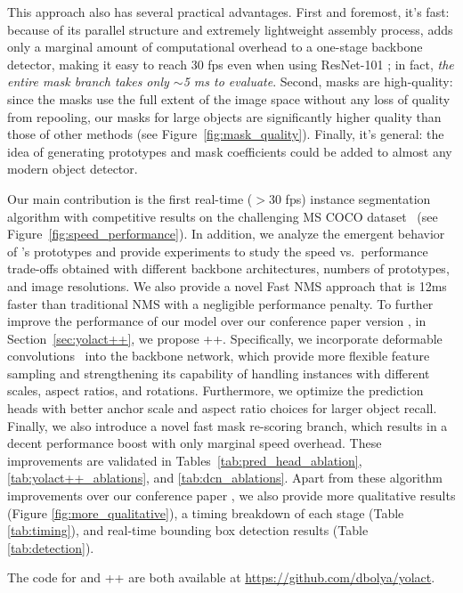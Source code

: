 \documentclass[10pt,journal,compsoc]{IEEEtran}
\begin{document}
This approach also has several practical advantages. First and foremost, it's fast: because of its parallel structure and extremely lightweight assembly process, \methodname{} adds only a marginal amount of computational overhead to a one-stage backbone detector, making it easy to reach 30 fps even when using ResNet-101 \cite{resnet}; in fact, \emph{the entire mask branch takes only $\sim$5 ms to evaluate}. Second, masks are high-quality: since the masks use the full extent of the image space without any loss of quality from repooling, our masks for large objects are significantly higher quality than those of other methods (see Figure~\ref{fig:mask_quality}). Finally, it's general: the idea of generating prototypes and mask coefficients could be added to almost any modern object detector.

Our main contribution is the first real-time ($>30$ fps) instance segmentation algorithm with competitive results on the challenging MS COCO dataset~\cite{coco} (see Figure~\ref{fig:speed_performance}). In addition, we analyze the emergent behavior of \methodname{}'s prototypes and provide experiments to study the speed vs.~performance trade-offs obtained with different backbone architectures, numbers of prototypes, and image resolutions. We also provide a novel Fast NMS approach that is 12ms faster than traditional NMS with a negligible performance penalty. To further improve the performance of our model over our conference paper version \cite{yolact}, in Section~\ref{sec:yolact++}, we propose \methodname{}++. Specifically, we incorporate deformable convolutions~\cite{deformv1, deformv2} into the backbone network, which provide more flexible feature sampling and strengthening its capability of handling instances with different scales, aspect ratios, and rotations. Furthermore, we optimize the prediction heads with better anchor scale and aspect ratio choices for larger object recall. Finally, we also introduce a novel fast mask re-scoring branch, which results in a decent performance boost with only marginal speed overhead. These improvements are validated in Tables~\ref{tab:pred_head_ablation}, \ref{tab:yolact++_ablations}, and \ref{tab:dcn_ablations}.  Apart from these algorithm improvements over our conference paper \cite{yolact}, we also provide more qualitative results (Figure \ref{fig:more_qualitative}), a timing breakdown of each stage (Table \ref{tab:timing}), and real-time bounding box detection results (Table \ref{tab:detection}). 




The code for \methodname{} and \methodname++ are both available at \href{https://github.com/dbolya/yolact}{https://github.com/dbolya/yolact}.
\end{document}
